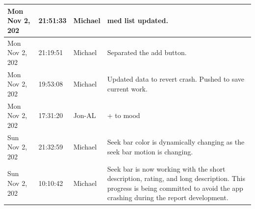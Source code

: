 \documentclass[11pt]{article}
\begin{document}
\begin{center}
\begin{longtable}{|p{2.7cm}|l|p{2cm}|p{8cm}|}
           \hline Mon Nov 2,  202                              & 21:51:33                           & Michael                                 & med list updated.                                                                                                                                                                                                                                                                                          \\
           \hline Mon Nov 2,  202                              & 21:19:51                           & Michael                                 & Separated the add button.                                                                                                                                                                                                                                                                                  \\
           \hline Mon Nov 2,  202                              & 19:53:08                           & Michael                                 & Updated data to revert crash. Pushed to save current work.                                                                                                                                                                                                                                                 \\
           \hline Mon Nov 2,  202                              & 17:31:20                           & Jon-AL                                  & + to mood                                                                                                                                                                                                                                                                                                  \\
           \hline Sun Nov 2,  202                              & 21:32:59                           & Michael                                 & Seek bar color is dynamically changing as the seek bar motion is changing.                                                                                                                                                                                                                                 \\
           \hline Sun Nov 2,  202                              & 10:10:42                           & Michael                                 & Seek bar is now working with the short description, rating, and long description. This progress is being committed to avoid the app crashing during the report development.                                                                                                                                \\

\end{longtable}
\end{center}
\end{document}

